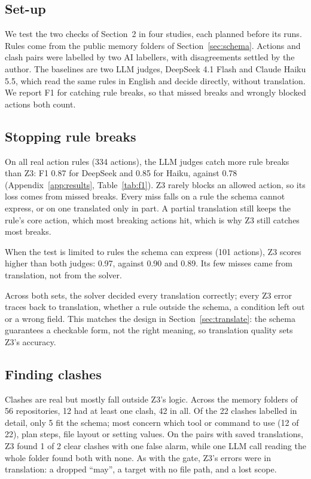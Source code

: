 \documentclass[11pt]{article}
\begin{document}
\subsection{Set-up}

We test the two checks of Section~2 in four studies, each planned before its runs. Rules come from
the public memory folders of Section~\ref{sec:schema}. Actions and clash pairs were labelled by two
AI labellers, with disagreements settled by the author. The baselines are two LLM judges, DeepSeek
4.1 Flash and Claude Haiku 5.5, which read the same rules in English and decide directly, without
translation. We report F1 for catching rule breaks, so that missed breaks and wrongly blocked
actions both count.

\subsection{Stopping rule breaks}

On all real action rules (334 actions), the LLM judges catch more rule breaks than Z3: F1 0.87 for
DeepSeek and 0.85 for Haiku, against 0.78 (Appendix~\ref{app:results}, Table~\ref{tab:f1}). Z3
rarely blocks an allowed action, so its loss comes from missed breaks. Every miss falls on a rule
the schema cannot express, or on one translated only in part. A partial translation still keeps
the rule's core action, which most breaking actions hit, which is why Z3 still catches most
breaks.

When the test is limited to rules the schema can express (101 actions), Z3 scores higher than both
judges: 0.97, against 0.90 and 0.89. Its few misses came from translation, not from the solver.

Across both sets, the solver decided every translation correctly; every Z3 error traces back to
translation, whether a rule outside the schema, a condition left out or a wrong field. This matches
the design in Section~\ref{sec:translate}: the schema guarantees a checkable form, not the right
meaning, so translation quality sets Z3's accuracy.

\subsection{Finding clashes}

Clashes are real but mostly fall outside Z3's logic. Across the memory folders of 56 repositories,
12 had at least one clash, 42 in all. Of the 22 clashes labelled in detail, only 5 fit the schema;
most concern which tool or command to use (12 of 22), plan steps, file layout or setting values.
On the pairs with saved translations, Z3 found 1 of 2 clear clashes with one false alarm, while one
LLM call reading the whole folder found both with none. As with the gate, Z3's errors were in
translation: a dropped ``may'', a target with no file path, and a lost scope.
\end{document}
